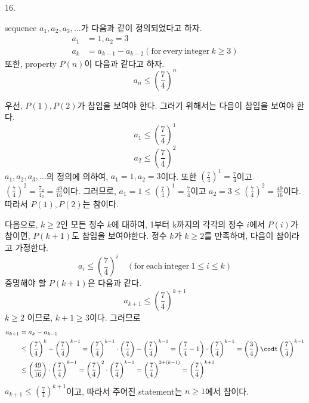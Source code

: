 \documentclass{article}
\begin{document}
16.
\begin{addmargin}[1em]{2em}
sequence $a_1, a_2, a_3,...$가 다음과 같이 정의되었다고 하자.
\begin{align*}
    a_1 &= 1, a_2 =3 \\
    a_k &= a_{k-1} - a_{k-2} (\mathrm{for\ every\ integer\ } k\ge 3)
\end{align*}
또한, property $P(n)$이 다음과 같다고 하자.
\[a_n \le \left( \frac{7}{4} \right)^n\]

우선, $P(1), P(2)$가 참임을 보여야 한다. 그러기 위해서는 다음이 참임을 보여야 한다.
\[a_1 \le \left( \frac{7}{4} \right)^1\]
\[a_2 \le \left( \frac{7}{4} \right)^2\]
$a_1, a_2, a_3,...$의 정의에 의하여, $a_1 =1, a_2=3$이다. 또한 $\left( \frac{7}{4} \right)^1 = \frac{7}{4}$이고 $\left( \frac{7}{4} \right)^2=\frac{7_2}{4_2}=\frac{49}{16}$이다. 그러므로, $a_1=1 \le \left( \frac{7}{4} \right)^1=\frac{7}{4}$이고 $a_2=3 \le \left( \frac{7}{4} \right)^2=\frac{49}{16}$이다. 따라서 $P(1), P(2)$는 참이다.
\newline

다음으로, $k\ge 2$인 모든 정수 $k$에 대하여, 1부터 k까지의 각각의 정수 $i$에서 $P(i)$가 참이면, $P(k+1)$도 참임을 보여야한다.
\newline
정수 $k$가  $k\ge 2$를 만족하며, 다음이 참이라고 가정한다.
\[a_i \le \left ( \frac{7}{4}\right)^i\quad(\mathrm{for\ each\ integer\ }1\le i \le k)\]
증명해야 할 $P(k+1)$은 다음과 같다.
\[a_{k+1} \le \left( \frac{7}{4} \right)^{k+1}\]
$k\ge 2$ 이므로, $k+1\ge 3$이다. 그러므로
\begin{align*}
    a_{k+1} &= a_k - a_{k-1} \\
    &\le \left( \frac{7}{4} \right)^{k} - \left( \frac{7}{4} \right)^{k-1} = \left( \frac{7}{4} \right)^{k-1}\cdot\left( \frac{7}{4} \right) - \left( \frac{7}{4} \right)^{k-1} = \left( \frac{7}{4}-1 \right) \cdot \left( \frac{7}{4} \right)^{k-1} =\left( \frac{3}{4} \right) \codt \left( \frac{7}{4} \right)^{k-1} \\
    &\le \left( \frac{49}{16} \right) \cdot \left( \frac{7}{4} \right)^{k-1} = \left( \frac{7}{4} \right)^2 \cdot \left( \frac{7}{4} \right)^{k-1} = \left( \frac{7}{4} \right)^{2+(k-1)} = \left( \frac{7}{4} \right)^{k+1} \\
\end{align*}
$a_{k+1} \le \left( \frac{7}{4} \right)^{k+1}$이고, 따라서 주어진 statement는 $n\ge 1$에서 참이다. 
\end{addmargin}
\bigskip
\end{document}
